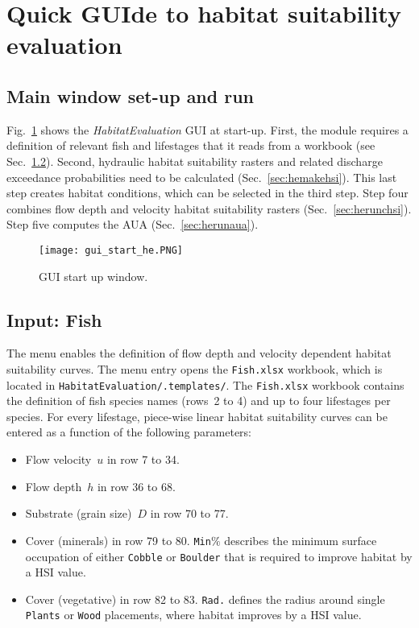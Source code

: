 \section{Quick GUIde to habitat suitability evaluation} \label{sec:hequick}
\subsection{Main window set-up and run} 
Fig.~\ref{fig:gui_start_he} shows the \textit{HabitatEvaluation} GUI at start-up. First, the module requires a definition of relevant fish and lifestages that it reads from a workbook (see Sec.~\ref{sec:hefish}). Second, hydraulic habitat suitability rasters and related discharge exceedance probabilities need to be calculated (Sec.~\ref{sec:hemakehsi}). This last step creates habitat conditions, which can be selected in the third step. Step four combines flow depth and velocity habitat suitability rasters (Sec.~\ref{sec:herunchsi}). Step five computes the AUA (Sec.~\ref{sec:herunaua}).
 
 
\begin{figure}[hbt]
	\begin{center}
	\texttt{[image: gui\_start\_he.PNG]} %
	\caption{GUI start up window. \label{fig:gui_start_he}}
	\end{center}
\end{figure}


\subsection{Input: Fish} \label{sec:hefish}
The  menu enables the definition of flow depth and velocity dependent habitat suitability curves. The  menu entry opens the \texttt{Fish.xlsx} workbook, which is located in \texttt{HabitatEvaluation/.templates/}. The \texttt{Fish.xlsx} workbook contains the definition of fish species names (rows~2 to 4) and up to four lifestages per species. For every lifestage, piece-wise linear habitat suitability curves can be entered as a function of the following parameters:
\begin{itemize}
  \item Flow velocity~$u$ in row 7 to 34.
  \item Flow depth~$h$ in row 36 to 68.
  \item Substrate (grain size)~$D$ in row 70 to 77.
  \item Cover (minerals) in row 79 to 80. \texttt{Min}$\%$ describes the minimum surface occupation of either \texttt{Cobble} or \texttt{Boulder} that is required to improve habitat by a HSI value.
  \item Cover (vegetative) in row 82 to 83. \texttt{Rad.} defines the radius around single \texttt{Plants} or \texttt{Wood} placements, where habitat improves by a HSI value.
\end{itemize}

